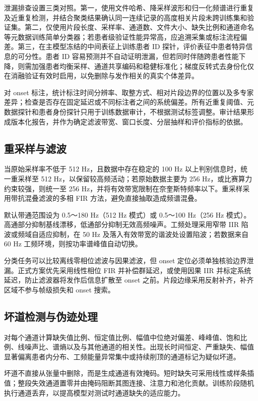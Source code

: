 \documentclass{cumcmthesis_v2}
\numberwithin{figure}{section} %
\numberwithin{table}{section} %
\begin{document}
泄漏排查设置三类对照。第一，使用文件哈希、降采样波形和归一化频谱进行重复及近重复检测，并结合聚类结果确认同一连续记录的高度相关片段未跨训练集和验证集。第二，仅使用片段长度、采样率、通道数、文件大小、缺失比例和通道命名等元数据训练简单分类器；若患者级验证性能异常高，应追溯采集或标注流程偏差。第三，在主模型冻结的中间表征上训练患者 ID 探针，评价表征中患者特异信息的可分性。患者 ID 容易预测并不自动证明泄漏，但若同时伴随跨患者性能下降，则需加强患者均衡采样、通道共享编码和稳健标准化；梯度反转式去身份化仅在消融验证有效时启用，以免删除与发作相关的真实个体差异。

对 onset 标注，统计标注时间分辨率、取整方式、相对片段边界的位置以及多专家差异；检查是否存在固定延迟或不同标注者之间的系统偏差。所有近重复阈值、元数据探针和患者身份探针只用于训练数据审计，不根据测试标签调整。审计结果形成版本化报告，并作为确定滤波带宽、窗口长度、分层抽样和评价指标的依据。

\subsection{重采样与滤波}
当原始采样率不低于 512 Hz，且数据中存在稳定的 100 Hz 以上判别信息时，统一重采样至 512 Hz，以保留较高频活动；若原始数据主要为 256 Hz，或比赛算力约束较强，则统一至 256 Hz，并将有效带宽限制在奈奎斯特频率以下。重采样采用带抗混叠滤波的多相 FIR 方法，避免直接抽取造成频谱混叠。

默认带通范围设为 0.5～180 Hz（512 Hz 模式）或 0.5～100 Hz（256 Hz 模式）。高通部分抑制基线漂移，低通部分抑制无效高频噪声。工频处理采用窄带 IIR 陷波或频域自适应抑制，在 50 Hz 及落入有效带宽的谐波处设置陷波；若数据来自 60 Hz 工频环境，则按功率谱峰值自动切换。

分类任务可以比较离线零相位滤波与因果滤波，但 onset 定位必须单独核验边界泄漏。正式方案优先采用线性相位 FIR 并补偿群延迟，或使用因果 IIR 并标定系统延迟，防止滤波器将发作后信息扩散至 onset 之前。片段边缘采用反射补齐，补齐区域不参与帧级损失和 onset 搜索。


\subsection{坏道检测与伪迹处理}
对每个通道计算缺失值比例、恒定值比例、幅值中位绝对偏差、峰峰值、饱和比例、线噪声比、谱熵以及与其他通道的相关性。出现长时间恒定、严重缺失、幅值显著偏离患者内分布、工频能量异常集中或持续削顶的通道标记为疑似坏道。

坏道不直接从张量中删除，而是生成通道有效掩码。短时缺失可采用线性或样条插值；整段失效通道置零并由掩码阻断其图连接、注意力和池化贡献。训练阶段随机执行通道丢弃，以提高模型对测试时通道缺失的适应能力。
\end{document}
